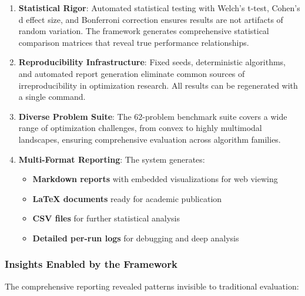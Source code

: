 \begin{enumerate}
\def\labelenumi{\arabic{enumi}.}
\item
  \textbf{Statistical Rigor}: Automated statistical testing with Welch's t-test, Cohen's d effect size, and Bonferroni correction ensures results are not artifacts of random variation. The framework generates comprehensive statistical comparison matrices that reveal true performance relationships.
\item
  \textbf{Reproducibility Infrastructure}: Fixed seeds, deterministic algorithms, and automated report generation eliminate common sources of irreproducibility in optimization research. All results can be regenerated with a single command.
\item
  \textbf{Diverse Problem Suite}: The 62-problem benchmark suite covers a wide range of optimization challenges, from convex to highly multimodal landscapes, ensuring comprehensive evaluation across algorithm families.
\item
  \textbf{Multi-Format Reporting}: The system generates:

  \begin{itemize}
  \tightlist
  \item
    \textbf{Markdown reports} with embedded visualizations for web viewing
  \item
    \textbf{LaTeX documents} ready for academic publication
  \item
    \textbf{CSV files} for further statistical analysis
  \item
    \textbf{Detailed per-run logs} for debugging and deep analysis
  \end{itemize}
\end{enumerate}

\hypertarget{insights-enabled-by-the-framework}{%
\subsubsection{Insights Enabled by the Framework}\label{insights-enabled-by-the-framework}}

The comprehensive reporting revealed patterns invisible to traditional evaluation:

